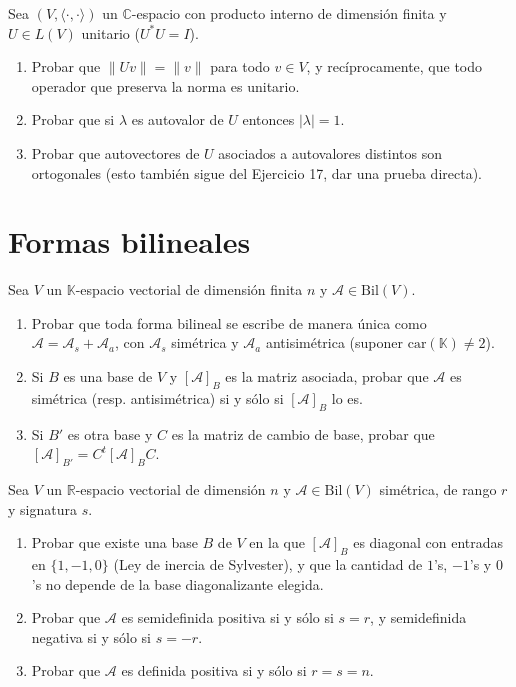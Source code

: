 \documentclass{article}
\newcommand{\R}{\mathbb{R}}
\newcommand{\C}{\mathbb{C}}
\newcommand{\K}{\mathbb{K}}
\theoremstyle{plain}
\theoremstyle{definition}
\theoremstyle{remark}
\newenvironment{ejercicio}[1]{\begin{trivlist}
\item[\hskip \labelsep {\bfseries Ejercicio}\hskip \labelsep {\bfseries #1.}]}{\end{trivlist}}
\begin{document}
\begin{ejercicio}{19}
    Sea \((V,\langle\cdot,\cdot\rangle)\) un \(\C\)-espacio con producto interno de dimensión finita y \(U \in L(V)\) unitario (\(U^*U = I\)).
    \begin{enumerate}
        \item Probar que \(\|Uv\| = \|v\|\) para todo \(v \in V\), y recíprocamente, que todo operador que preserva la norma es unitario.
        \item Probar que si \(\lambda\) es autovalor de \(U\) entonces \(|\lambda| = 1\).
        \item Probar que autovectores de \(U\) asociados a autovalores distintos son ortogonales (esto también sigue del Ejercicio 17, dar una prueba directa).
    \end{enumerate}
\end{ejercicio}

\section{Formas bilineales}

\begin{ejercicio}{20}
    Sea \(V\) un \(\K\)-espacio vectorial de dimensión finita \(n\) y \(\mathcal A \in \mathrm{Bil}(V)\).
    \begin{enumerate}
        \item Probar que toda forma bilineal se escribe de manera única como \(\mathcal A = \mathcal A_s + \mathcal A_a\), con \(\mathcal A_s\) simétrica y \(\mathcal A_a\) antisimétrica (suponer \(\mathrm{car}(\K) \neq 2\)).
        \item Si \(B\) es una base de \(V\) y \([\mathcal A]_B\) es la matriz asociada, probar que \(\mathcal A\) es simétrica (resp. antisimétrica) si y sólo si \([\mathcal A]_B\) lo es.
        \item Si \(B'\) es otra base y \(C\) es la matriz de cambio de base, probar que \([\mathcal A]_{B'} = C^t [\mathcal A]_B C\).
    \end{enumerate}
\end{ejercicio}

\begin{ejercicio}{21}
    Sea \(V\) un \(\R\)-espacio vectorial de dimensión \(n\) y \(\mathcal A \in \mathrm{Bil}(V)\) simétrica, de rango \(r\) y signatura \(s\).
    \begin{enumerate}
        \item Probar que existe una base \(B\) de \(V\) en la que \([\mathcal A]_B\) es diagonal con entradas en \(\{1,-1,0\}\) (Ley de inercia de Sylvester), y que la cantidad de \(1\)'s, \(-1\)'s y \(0\)'s no depende de la base diagonalizante elegida.
        \item Probar que \(\mathcal A\) es semidefinida positiva si y sólo si \(s = r\), y semidefinida negativa si y sólo si \(s = -r\).
        \item Probar que \(\mathcal A\) es definida positiva si y sólo si \(r = s = n\).
    \end{enumerate}
\end{ejercicio}
\end{document}
